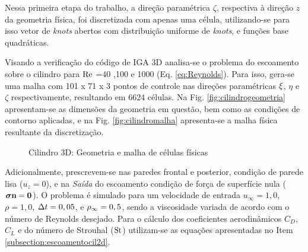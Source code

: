 \documentclass[tese_patricia]{subfiles}
\begin{document}
Nessa primeira etapa do trabalho, a direção paramétrica $\zeta$, respectiva à direção $z$ da geometria física, foi discretizada com apenas uma célula, utilizando-se para isso vetor de \textit{knots} abertos com distribuição uniforme de \textit{knots}, e funções base quadráticas.

Visando a verificação do código de IGA 3D analisa-se o problema do escoamento sobre o cilindro para $\mathrm{Re}$ =40 ,100 e 1000 (Eq. \eqref{eq:Reynolds}). Para isso, gera-se uma malha com 101 x 71 x 3 pontos de controle nas direções paramétricas $\xi$, $\eta$ e $\zeta$ respectivamente, resultando em 6624 células. Na Fig. \ref{fig:cilindrogeometria} apresentam-se as dimensões da geometria em questão, bem como as condições de contorno aplicadas, e na Fig. \ref{fig:cilindromalha} apresenta-se a malha física resultante da discretização.


\begin{figure}[!htb]
	\centering
	\caption{Cilindro 3D: Geometria e malha de células físicas}
	\label{fig:cilindro_geoemalha}
\end{figure}

Adicionalmente, prescrevem-se nas paredes frontal e posterior, condição de parede lisa ($u_{z} = 0$), e na \textit{Saída} do escoamento condição de força de superfície nula ($\boldsymbol{\sigma} \mathbf{n} = \mathbf{0}$). O problema é simulado para um velocidade de entrada $u_{\infty} = 1,0$, $\rho = 1,0$, $\Delta t = 0,05$, e $\rho_\infty = 0,5$, sendo a viscosidade variada de acordo com o número de Reynolds desejado.  Para o cálculo dos coeficientes aerodinâmicos $C_{D}$, $C_{L}$ e do número de Strouhal ($\mathrm{St}$) utilizam-se as equações apresentadas no Item \ref{subsection:escoamentocil2d}. 
\end{document}
